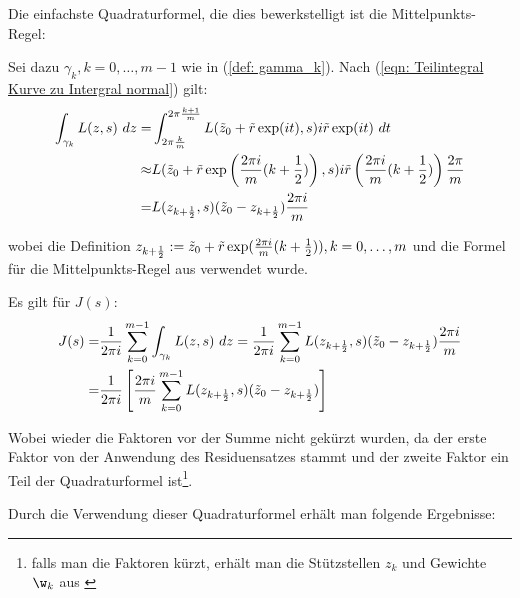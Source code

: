 \documentclass[a4paper,12pt]{report}
\newcommand{\zitat}[1]{\glqq #1\grqq}
\newcommand{\klammer}[1]{\left(#1\right)}
\newcommand{\1}{\mathds{1}}
\theoremstyle{plain} %
\theoremstyle{definition} %
\theoremstyle{remark}
\begin{document}
            Die einfachste Quadraturformel, die dies bewerkstelligt ist die \zitat{Mittelpunkts-Regel}\cite[S. 526]{numerikHermann}:

            Sei dazu $\gamma_k, k=0,\dots,m-1$ wie in (\ref{def: gamma_k}). Nach (\ref{eqn: Teilintegral Kurve zu Intergral normal}) gilt:
            \begin{align*}
                  \int_{\gamma_k} L(z, s)\ dz =& \int_{2\pi \frac{k}{m}}^{2\pi\frac{k+1}{m}}L(\Tilde z_0+\Tilde r\exp(it), s)i\Tilde r \exp(it)\ dt\\
                  \approx& L(\Tilde z_0+\Tilde r\exp\klammer{\frac{2\pi i}{m}(k+\frac{1}{2})}, s)i\Tilde r \klammer{\frac{2\pi i}{m}(k+\frac{1}{2})} \frac{2\pi}{m}\\
                  =& L(z_{k+\frac{1}{2}}, s)(\Tilde z_0-z_{k+\frac{1}{2}}) \frac{2\pi i}{m}
            \end{align*}

            wobei die Definition $z_{k+\frac{1}{2}}:= \Tilde z_0+\Tilde r\exp(\frac{2\pi i}{m}(k+\frac{1}{2})), k=0,\dots,m$ und die Formel für die Mittelpunkts-Regel aus \cite[S. 526]{numerikHermann} verwendet wurde.

            Es gilt für $J(s)$:
            \begin{align}
                  J(s) =& \frac{1}{2\pi i}\sum_{k=0}^{m-1} \int_{\gamma_k} L(z, s)\ dz = \frac{1}{2\pi i}\sum_{k=0}^{m-1} L(z_{k+\frac{1}{2}}, s)(\Tilde z_0-z_{k+\frac{1}{2}}) \frac{2\pi i}{m}\nonumber\\
                  =&  \frac{1}{2\pi i}\left[\frac{2\pi i}{m}\sum_{k=0}^{m-1} L(z_{k+\frac{1}{2}}, s)(\Tilde z_0-z_{k+\frac{1}{2}})\right]\label{def: Mittelpunkts-Regel, angewendet}
            \end{align}

            Wobei wieder die Faktoren vor der Summe nicht gekürzt wurden, da der erste Faktor von der Anwendung des Residuensatzes stammt und der zweite Faktor ein Teil der Quadraturformel ist\footnote{falls man die Faktoren kürzt, erhält man die Stützstellen $z_k$ und Gewichte $\w_k$ aus \cite[S. 128]{grundlageFutamura}}.

            Durch die Verwendung dieser Quadraturformel erhält man folgende Ergebnisse:
\end{document}
